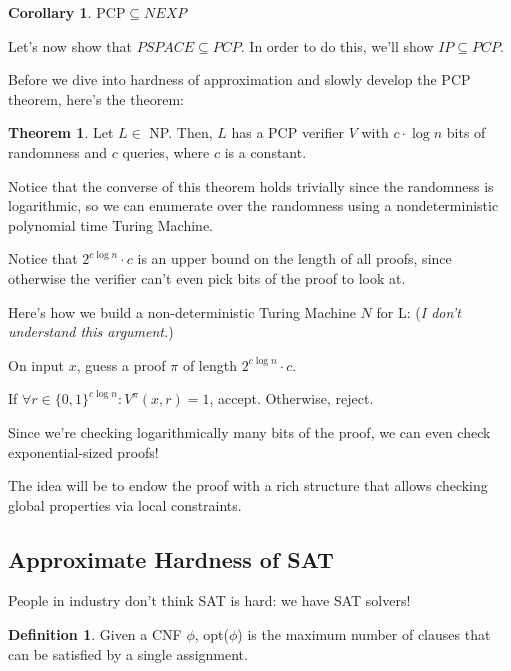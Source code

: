 \documentclass{article}
\theoremstyle{definition}
\newtheorem{definition}{Definition}
\newtheorem{theorem}{Theorem}[section]
\newtheorem{corollary}{Corollary}[theorem]
\newcommand{\pcp}{\text{PCP}}
\begin{document}
\begin{corollary}
    $\pcp \subseteq NEXP$
\end{corollary}

Let's now show that $PSPACE \subseteq PCP$. In order to do this,
we'll show $IP \subseteq PCP$.



Before we dive into hardness of approximation and slowly develop the PCP theorem, here's the theorem:

\begin{theorem}
    Let $L \in$ NP. Then, $L$ has a PCP verifier $V$ with
    $c \cdot \log n$ bits of randomness and $c$ queries, where $c$
    is a constant.
\end{theorem}

Notice that the converse of this theorem holds trivially since the randomness
is logarithmic, so we can enumerate over the randomness using a nondeterministic
polynomial time Turing Machine.

Notice that $2^{c \log{n}} \cdot c$ is an upper bound on the length of all proofs,
since otherwise the verifier can't even pick bits of the proof to look at.

Here's how we build a non-deterministic Turing Machine $N$ for L: (\textit{I don't 
understand this argument.})

On input $x$, guess a proof $\pi$ of length $2^{c \log{n}} \cdot c$.

If $\forall r \in \{0,1\}^{c \log n}: V^{\pi}(x,r) = 1$, accept.
Otherwise, reject.

Since we're checking logarithmically many bits of the proof, we can even check exponential-sized proofs!

The idea will be to endow the proof with a rich structure that allows checking global properties
via local constraints.

\newpage

\subsection{Approximate Hardness of SAT}

People in industry don't think SAT is hard: we have SAT solvers!

\begin{definition}
    Given a CNF $\phi$, opt($\phi$) is the maximum 
    number of clauses that can be satisfied by a single
    assignment.
\end{definition}
\end{document}
